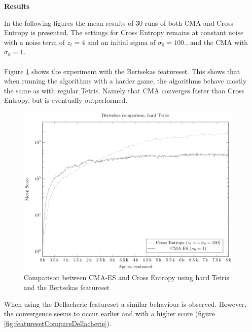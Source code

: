 \textbf{Results}

In the following figures the mean results of 30 runs of both CMA and Cross 
Entropy is presented. The settings for Cross Entropy remains at constant noise
with a noise term of $z_t = 4$ and an initial sigma of $\sigma_0 = 100.$, 
and the CMA with $\sigma_0 = 1$.\\
\\
Figure \ref{fig:featuresetCompareBertsekas} shows the experiment with the 
Bertsekas featureset. This shows that when running the algorithms with a
harder game, the algorithms behave mostly the same as with regular 
Tetris. Namely that CMA converges faster than Cross Entropy, 
but is eventually outperformed.

\begin{figure}[H]
\includegraphics[scale=1]{plots/plotBertsekasCmaVsCEHardTetris}
\caption{Comparison between CMA-ES and Cross Entropy 
using hard Tetris and the Bertsekas featureset 
\label{fig:featuresetCompareBertsekas}}
\end{figure}

When using the Dellacherie featureset a similar behaviour is observed.
However, the convergence seems to occur earlier and with a higher score
(figure \ref{fig:featuresetCompareDellacherie}).

